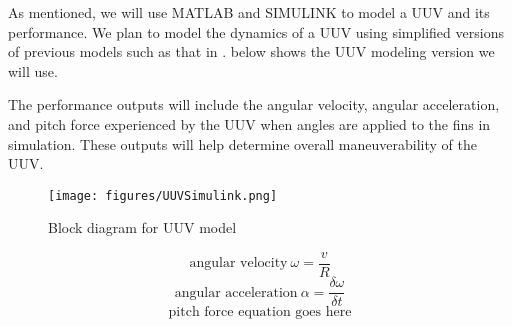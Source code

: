 \documentclass{IEEEtran}
\begin{document}
As mentioned, we will use MATLAB and SIMULINK to model a UUV and its performance. We plan to model the dynamics of a UUV using simplified versions of previous models such as that in
\cite{liu2005mimicry}.  below shows the UUV modeling version we will use.

The performance outputs will include the angular velocity, angular acceleration, and pitch force experienced by the UUV when angles are applied to the fins in simulation. These outputs will help determine overall maneuverability of the UUV.
\begin{figure*}
\begin{center}
\texttt{[image: figures/UUVSimulink.png]}
\end{center}
\caption{Block diagram for UUV model}
\label{fig:5}
\end{figure*}
\begin{equation}
\mbox{angular velocity}\ \omega = \frac{v}{R} 
\label{eq:1}
\end{equation}
\begin{equation}
\mbox{angular acceleration}\ \alpha = \frac{\delta\omega}{\delta t}
\label{eq:2}
\end{equation}
\begin{equation}
\mbox{pitch force equation goes here}
\label{eq:3}
\end{equation}
\end{document}
